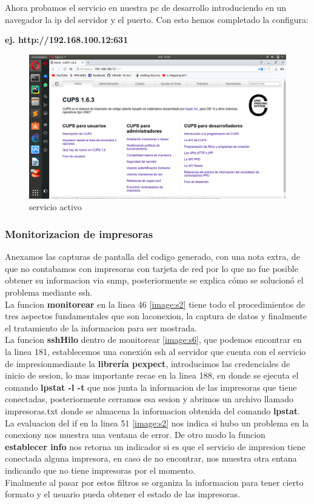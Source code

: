 Ahora probamos el servicio en nuestra pc de desarrollo introduciendo en un navegador la ip del servidor y el puerto. Con esto hemos completado la configura:
\\
\begin{center}
					\textbf{ej. http://192.168.100.12:631}
\end {center}
\FloatBarrier
\begin{figure}[htbp!]
		\centering
			\includegraphics[width=.9\textwidth]{images/r8}
		\caption{servicio activo}
		\label{image:r8}
\end{figure}
\FloatBarrier


\subsubsection{Monitorizacion de impresoras}

Anexamos las capturas de pantalla del codigo generado, con una nota extra, de que no contabamos con impresoras con tarjeta de red por lo que no fue posible obtener su informacion via snmp, posteriormente se explica cómo se solucionó el problema mediante ssh.
\\
La funcion \textbf{monitorear} en la linea 46 \ref{image:s2} tiene todo el procedimientos de tres aspectos fundamentales que son laconexion, la captura de datos y finalmente el tratamiento de la informacion para ser mostrada.
\\
La funcion \textbf{sshHilo} dentro de monitorear \ref{image:s6}, que podemos encontrar en la linea 181, establecemos una conexión ssh al servidor que cuenta con el servicio de impresionmediante la \textbf{librería pexpect}, introducimos las credenciales de inicio de sesion, lo mas importante recae en la linea 188, en donde se ejecuta el comando \textbf{lpstat -l -t} que nos junta la informacion de las impresoras que tiene conectadas, posteriormente cerramos esa sesion y abrimos un archivo llamado impresoras.txt donde se almacena la informacion obtenida del comando \textbf{lpstat}.
\\
La evaluacion del if en la linea 51 \ref{image:s2} nos indica si hubo un problema en la conexiony nos muestra una ventana de error.
De otro modo la funcion \textbf{establecer info} nos retorna un indicador si es que el servicio de impresion tiene conectada alguna impresora, en caso de no encontrar, nos muestra otra  entana indicando que no tiene impresoras por el momento.
\\
Finalmente al pasar por estos filtros se organiza la informacion para tener cierto formato y el usuario pueda obtener el estado de las impresoras.

